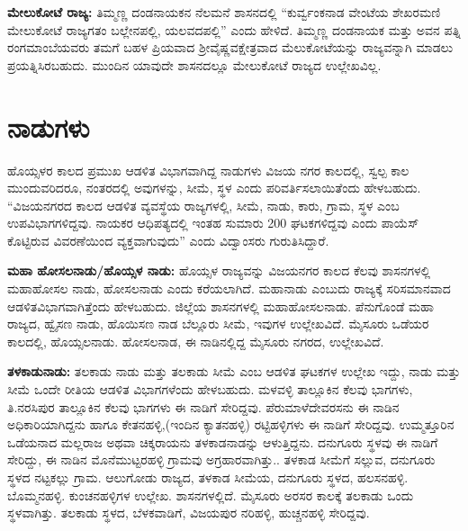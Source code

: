 \textbf{ಮೇಲುಕೋಟೆ ರಾಜ್ಯ:} ತಿಮ್ಮಣ್ಣ ದಂಡನಾಯಕನ ನೆಲಮನೆ ಶಾಸನದಲ್ಲಿ “ಕುರ್ವ್ವಂಕನಾಡ ವೇಂಟೆಯ ಶೇಖರಮಣಿ ಮೇಲುಕೋಟೆ ರಾಜ್ಯಗತಂ ಬಲ್ಲೇನಪಲ್ಲಿ, ಯಲವದಪಲ್ಲಿ” ಎಂದು ಹೇಳಿದೆ. ತಿಮ್ಮಣ್ಣ ದಂಡನಾಯಕ ಮತ್ತು ಅವನ ಪತ್ನಿ ರಂಗಮಾಂಬೆಯವರು ತಮಗೆ ಬಹಳ ಪ್ರಿಯವಾದ ಶ‍್ರೀವೈಷ್ಣವಕ್ಷೇತ್ರವಾದ ಮೆಲುಕೋಟೆಯನ್ನು ರಾಜ್ಯವನ್ನಾಗಿ ಮಾಡಲು ಪ್ರಯತ್ನಿಸಿರಬಹುದು. ಮುಂದಿನ ಯಾವುದೇ ಶಾಸನದಲ್ಲೂ ಮೇಲುಕೋಟೆ ರಾಜ್ಯದ ಉಲ್ಲೇಖವಿಲ್ಲ.


\section{ನಾಡುಗಳು}

ಹೊಯ್ಸಳರ ಕಾಲದ ಪ್ರಮುಖ ಆಡಳಿತ ವಿಭಾಗವಾಗಿದ್ದ ನಾಡುಗಳು ವಿಜಯ ನಗರ ಕಾಲದಲ್ಲಿ, ಸ್ವಲ್ಪ ಕಾಲ ಮುಂದುವರಿದರೂ, ನಂತರದಲ್ಲಿ ಅವುಗಳನ್ನು, ಸೀಮೆ, ಸ್ಥಳ ಎಂದು ಪರಿವರ್ತಿಸಲಾಯಿತೆಂದು ಹೇಳಬಹುದು. “ವಿಜಯನಗರದ ಕಾಲದ ಆಡಳಿತ ವ್ಯವಸ್ಥೆಯ ರಾಜ್ಯಗಳಲ್ಲಿ, ಸೀಮೆ, ನಾಡು, ಕಾರು, ಗ್ರಾಮ, ಸ್ಥಳ ಎಂಬ ಉಪವಿಭಾಗಗಳಿದ್ದವು. ನಾಯಕರ ಆಧಿಪತ್ಯದಲ್ಲಿ ಇಂತಹ ಸುಮಾರು 200 ಘಟಕಗಳಿದ್ದವು ಎಂದು ಪಾಯೆಸ್​ ಕೊಟ್ಟಿರುವ ವಿವರಣೆಯಿಂದ ವ್ಯಕ್ತವಾಗುವುದು” ಎಂದು ವಿದ್ವಾಂಸರು ಗುರುತಿಸಿದ್ದಾರೆ.

\textbf{ಮಹಾ ಹೋಸಲನಾಡು/ಹೊಯ್ಸಳ ನಾಡು:} ಹೊಯ್ಸಳ ರಾಜ್ಯವನ್ನು ವಿಜಯನಗರ ಕಾಲದ ಕೆಲವು ಶಾಸನಗಳಲ್ಲಿ ಮಹಾಹೋಸಲ ನಾಡು, ಹೋಸಲನಾಡು ಎಂದು ಕರೆಯಲಾಗಿದೆ. ಮಹಾನಾಡು ಎಂಬುದು ರಾಜ್ಯಕ್ಕೆ ಸರಿಸಮಾನವಾದ ಆಡಳಿತವಿಭಾಗವಾಗಿತ್ತೆಂದು ಹೇಳಬಹುದು. ಜಿಲ್ಲೆಯ ಶಾಸನಗಳಲ್ಲಿ ಮಹಾಹೋಸಲನಾಡು. ಪೆನುಗೊಂಡೆ ಮಹಾ ರಾಜ್ಯದ, ಹ್ವೈಸಣ ನಾಡು, ಹೊಯಿಸಣ ನಾಡ ಬೆಲ್ಲೂರು ಸೀಮೆ, ಇವುಗಳ ಉಲ್ಲೇಖವಿದೆ. ಮೈಸೂರು ಒಡೆಯರ ಕಾಲದಲ್ಲಿ, ಹೊಯ್ಸಲನಾಡು. ಹೋಸಲನಾಡ, ಈ ನಾಡಿನಲ್ಲಿದ್ದ ಮೈಸೂರು ನಗರದ, ಉಲ್ಲೇಖವಿದೆ.

\textbf{ತಳಕಾಡುನಾಡು:} ತಲಕಾಡು ನಾಡು ಮತ್ತು ತಲಕಾಡು ಸೀಮೆ ಎಂಬ ಆಡಳಿತ ಘಟಕಗಳ ಉಲ್ಲೇಖ ಇದ್ದು, ನಾಡು ಮತ್ತು ಸೀಮೆ ಒಂದೇ ರೀತಿಯ ಆಡಳಿತ ವಿಭಾಗಗಳೆಂದು ಹೇಳಬಹುದು. ಮಳವಳ್ಳಿ ತಾಲ್ಲೂಕಿನ ಕೆಲವು ಭಾಗಗಳು, ತಿ.ನರಸಿಪುರ ತಾಲ್ಲೂಕಿನ ಕೆಲವು ಭಾಗಗಳು ಈ ನಾಡಿಗೆ ಸೇರಿದ್ದವು. ಪೆರುಮಾಳೆದೇವರಸನು ಈ ನಾಡಿನ ಅಧಿಕಾರಿಯಾಗಿದ್ದನು ಹಾಗೂ ಕೇತನಹಳ್ಳಿ,(ಇಂದಿನ ಕ್ಯಾತನಹಳ್ಳಿ) ರಟ್ಟಿಹಳ್ಳಿಗಳು ಈ ನಾಡಿಗೆ ಸೇರಿದ್ದವು. ಉಮ್ಮತ್ತೂರಿನ ಒಡೆಯನಾದ ಮಲ್ಲರಾಜ ಅಥವಾ ಚಿಕ್ಕರಾಯನು ತಳಕಾಡನಾಡನ್ನು ಆಳುತ್ತಿದ್ದನು. ದನುಗೂರು ಸ್ಥಳವು ಈ ನಾಡಿಗೆ ಸೇರಿದ್ದು, ಈ ನಾಡಿನ ಮೊನೆಮುಟ್ಟರಹಳ್ಳಿ ಗ್ರಾಮವು ಅಗ್ರಹಾರವಾಗಿತ್ತು.. ತಳಕಾಡ ಸೀಮೆಗೆ ಸಲ್ಲುವ, ದನುಗೂರು ಸ್ಥಳದ ನಟ್ಟಕಲ್ಲು ಗ್ರಾಮ. ಆಲುಗೋಡು ರಾಜ್ಯದ, ತಳಕಾಡ ಸೀಮೆಯ, ದನುಗೂರು ಸ್ಥಳದ, ಹಲಸನಹಳ್ಳಿ. ಬೊಮ್ಮನಹಳ್ಳಿ. ಕುಂಚನಹಳ್ಳಿಗಳ ಉಲ್ಲೇಖ. ಶಾಸನಗಳಲ್ಲಿದೆ. ಮೈಸೂರು ಅರಸರ ಕಾಲಕ್ಕೆ ತಲಕಾಡು ಒಂದು ಸ್ಥಳವಾಗಿತ್ತು. ತಲಕಾಡು ಸ್ಥಳದ, ಬೆಳಕವಾಡಿಗೆ, ವಿಜಯಪುರ ನರಿಹಳ್ಳಿ, ಹುಚ್ಚನಹಳ್ಳಿ ಸೇರಿದ್ದವು.

